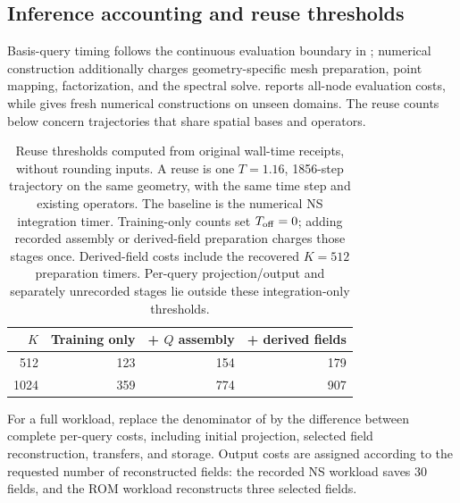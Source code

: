 \subsection{Inference accounting and reuse thresholds}
\label{app:inference-amortization}
Basis-query timing follows the continuous evaluation boundary in ; numerical construction additionally charges geometry-specific mesh preparation, point mapping, factorization, and the spectral solve.  reports all-node evaluation costs, while  gives fresh numerical constructions on unseen domains. The reuse counts below concern trajectories that share spatial bases and operators.

\begin{table}[!htb]\centering\small
\caption{Reuse thresholds computed from original wall-time receipts, without rounding inputs. A reuse is one $T=1.16$, 1856-step trajectory on the same geometry, with the same time step and existing operators. The baseline is the numerical NS integration timer. Training-only counts set $T_{\rm off}=0$; adding recorded assembly or derived-field preparation charges those stages once. Derived-field costs include the recovered $K=512$ preparation timers. Per-query projection/output and separately unrecorded stages lie outside these integration-only thresholds.}
\label{tab:inference-amortization}
\begin{tabular}{rrrr}\toprule
$K$&Training only&+ $Q$ assembly&+ derived fields\\\midrule
512&123&154&179\\
1024&359&774&907\\
\bottomrule\end{tabular}\end{table}

For a full workload, replace the denominator of  by the difference between complete per-query costs, including initial projection, selected field reconstruction, transfers, and storage. Output costs are assigned according to the requested number of reconstructed fields: the recorded NS workload saves 30 fields, and the ROM workload reconstructs three selected fields.

